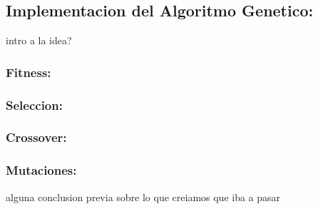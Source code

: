 \subsection{Implementacion del Algoritmo Genetico:}

intro a la idea?


\subsubsection{Fitness:}


\subsubsection{Seleccion:}


\subsubsection{Crossover:}


\subsubsection{Mutaciones:}


alguna conclusion previa sobre lo que creiamos que iba a pasar
